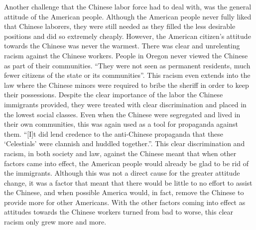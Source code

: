 \documentclass[12pt, twoside]{article}
\begin{document}
Another challenge that the Chinese labor force had to deal with, was the general attitude of the American people. Although the American people never fully liked that Chinese laborers, they were still needed as they filled the less desirable positions and did so extremely cheaply. However, the American citizen's attitude towards the Chinese was never the warmest. There was clear and unrelenting racism against the Chinese workers. People in Oregon never viewed the Chinese as part of their communities. ``They were not seen as permanent residents, much fewer citizens of the state or its communities''\cite[5]{RCSP}. This racism even extends into the law where the Chinese minors were required to bribe the sheriff in order to keep their possessions\cite[5]{RCSP}. Despite the clear importance of the labor the Chinese immigrants provided, they were treated with clear discrimination and placed in the lowest social classes. Even when the Chinese were segregated and lived in their own communities, this was again used as a tool for propaganda against them. ``[I]t did lend credence to the anti-Chinese propaganda that these `Celestials' were clannish and huddled together.''\cite[9]{TCIO}. This clear discrimination and racism, in both society and law, against the Chinese meant that when other factors came into effect, the American people would already be glad to be rid of the immigrants. Although this was not a direct cause for the greater attitude change, it was a factor that meant that there would be little to no effort to assist the Chinese, and when possible America would, in fact, remove the Chinese to provide more for other Americans. With the other factors coming into effect as attitudes towards the Chinese workers turned from bad to worse, this clear racism only grew more and more.
\par
\end{document}
